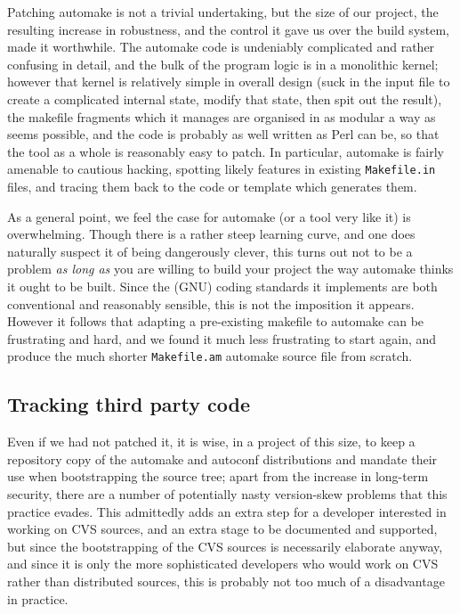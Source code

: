 \documentclass{speauth}
\begin{document}
Patching automake is not a trivial undertaking, but the size of our
project, the resulting increase in robustness, and the control it gave
us over the build system, made it worthwhile.  The automake code is
undeniably complicated and rather confusing in detail, and the bulk of
the program logic is in a monolithic kernel; however that kernel is
relatively simple in overall design (suck in the input file to create
a complicated internal state, modify that state, then spit out
the result), the makefile fragments which it manages are organised in
as modular a way as seems possible, and the code is probably as well
written as Perl can be, so
that the tool as a whole is reasonably easy to patch.  In particular,
automake is fairly amenable to cautious hacking, spotting likely
features in existing \texttt{Makefile.in} files, and tracing them back
to the code or template which generates them.

As a general point, we feel the case for automake (or a tool very like
it) is overwhelming.  Though
there is a rather steep learning curve, and one does naturally suspect
it of being dangerously clever, this turns out not to be a problem
\emph{as long as} you are willing to build your project the way
automake thinks it ought to be built.  Since the (GNU) coding
standards it implements are both conventional and reasonably sensible,
this is not the imposition it appears.  However it follows that
adapting a pre-existing makefile to automake can be frustrating and
hard, and we found it much less frustrating to start again, and produce the
much shorter \texttt{Makefile.am} automake source file from scratch.

\subsection{Tracking third party code}

Even if we had not patched it, it is wise, in a project of this size,
to keep a repository copy of the automake and autoconf distributions
and mandate their use when bootstrapping the source tree; apart from
the increase in long-term security, there are a number of potentially
nasty version-skew problems that this practice evades.  This
admittedly adds an extra step for a developer interested in working on
CVS sources, and an extra stage to be documented and supported, but
since the bootstrapping of the CVS sources is necessarily elaborate
anyway, and since it is only the more sophisticated developers who
would work on CVS rather than distributed sources, this is probably
not too much of a disadvantage in practice.
\end{document}
